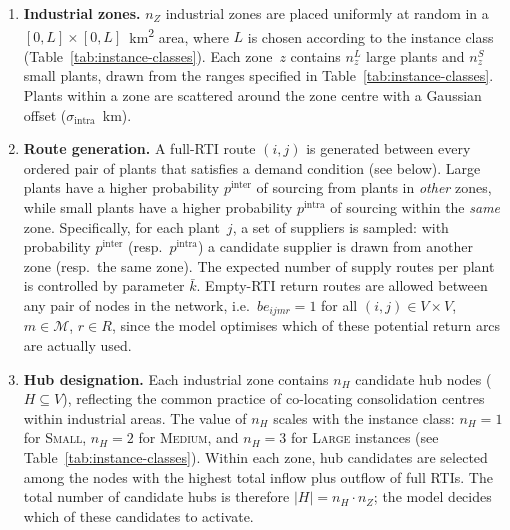 \begin{enumerate}
  \item \textbf{Industrial zones.}
        $n_Z$ industrial zones are placed uniformly at random in a
        $[0, L] \times [0, L]$~km\textsuperscript{2} area, where
        $L$ is chosen according to the instance class
        (Table~\ref{tab:instance-classes}).  Each zone~$z$ contains
        $n^{L}_z$ large plants and $n^{S}_z$ small plants, drawn
        from the ranges specified in Table~\ref{tab:instance-classes}.
        Plants within a zone are scattered around the zone centre
        with a Gaussian offset ($\sigma_{\text{intra}}$~km).

  \item \textbf{Route generation.}
        A full-RTI route $(i,j)$ is generated between every
        ordered pair of plants that satisfies a demand condition
        (see below). Large plants have a higher probability
        $p^{\text{inter}}$ of sourcing from plants in \emph{other}
        zones, while small plants have a higher probability
        $p^{\text{intra}}$ of sourcing within the \emph{same}
        zone. Specifically, for each plant~$j$, a set of suppliers
        is sampled: with probability $p^{\text{inter}}$ (resp.\
        $p^{\text{intra}}$) a candidate supplier is drawn from
        another zone (resp.\ the same zone). The expected number of
        supply routes per plant is controlled by parameter
        $\bar{k}$. Empty-RTI return routes are allowed between any
        pair of nodes in the network, i.e.\ $be_{ijmr}=1$ for all
        $(i,j) \in V \times V$, $m \in \mathcal{M}$, $r \in R$,
        since the model optimises which of these potential return
        arcs are actually used.

  \item \textbf{Hub designation.}
        Each industrial zone contains $n_H$ candidate hub nodes
        ($H \subseteq V$), reflecting the common practice of
        co-locating consolidation centres within industrial areas.
        The value of $n_H$ scales with the instance class:
        $n_H = 1$ for \textsc{Small}, $n_H = 2$ for
        \textsc{Medium}, and $n_H = 3$ for \textsc{Large}
        instances (see Table~\ref{tab:instance-classes}). Within
        each zone, hub candidates are selected among the nodes
        with the highest total inflow plus outflow of full RTIs.
        The total number of candidate hubs is therefore
        $|H| = n_H \cdot n_Z$; the model decides which of these
        candidates to activate.
\end{enumerate}

